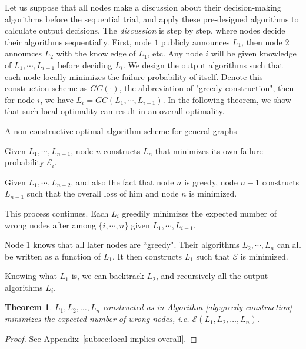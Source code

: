 \documentclass[a4paper,UKenglish]{lipics}
\newtheorem{thm}{Theorem}[section] %
\theoremstyle{definition}
\begin{document}
Let us suppose that all nodes make a discussion about their decision-making algorithms before the sequential trial, and apply these pre-designed algorithms to calculate output decisions.
The \emph{discussion} is step by step, where nodes decide their algorithms sequentially.
First, node $1$ publicly announces $L_1$, then node 2 announces $L_2$ with the knowledge of $L_1$, etc. 
Any node $i$ will be given knowledge of $L_1, \dotsb, L_{i-1}$ before deciding $L_i$.
We design the output algorithms such that each node locally minimizes the failure probability of itself.
Denote this construction scheme as $GC(\cdot)$, the abbreviation of "greedy construction",
	then for node $i$, we have $L_i = GC(L_1,\dotsb,L_{i-1})$.
In the following theorem, we show that such local optimality can result in an overall optimality.

\begin{algorithm}[htb]
\caption{A non-constructive optimal algorithm scheme for general graphs}
\begin{algorithmic}[1]
\label{alg:greedy construction}
\STATE Given $L_1, \dotsb, L_{n-1}$, node $n$ constructs $L_n$ that minimizes its own failure probability $\mathcal{E}_i$.

\STATE Given $L_1, \dotsb, L_{n-2}$, and also the fact that node $n$ is greedy,
		 node $n - 1$ constructs $L_{n-1}$ such that the overall loss of him and node $n$ is minimized.

\STATE This process continues. Each $L_i$ greedily minimizes the expected number of wrong nodes after among $\{i, \dotsb, n\}$
		 given $L_1, \dotsb, L_{i-1}$. 

\STATE Node 1 knows that all later nodes are ``greedy".
	Their algorithms $L_2, \dotsb, L_n$ can all be written as a function of $L_1$. 
	It then constructs $L_1$ such that $\mathcal{E}$ is minimized.

\STATE Knowing what $L_1$ is, we can backtrack $L_2$, and recursively all the output algorithms $L_i$.
\end{algorithmic}
\end{algorithm}

\begin{thm}
\label{local implies overall}
$L_1, L_2, \dots, L_n$ constructed as in Algorithm \ref{alg:greedy construction} minimizes the expected number of wrong nodes, 
	i.e. $\mathcal{E}(L_1, L_2, \dots, L_n)$.
\end{thm}
\begin{proof}
See Appendix~\ref{subsec:local implies overall}.
\end{proof}
\end{document}
